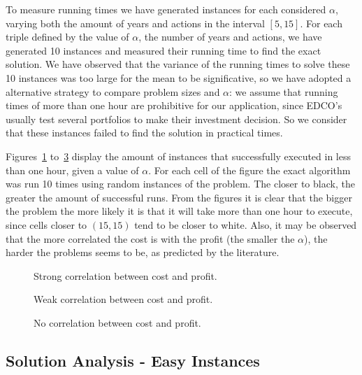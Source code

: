 To measure running times we have generated instances for each considered $\alpha$, varying both the amount of years and actions
in the interval $[5,15]$. For each triple defined by the value of $\alpha$, the number of years and actions,
we have generated 10 instances and measured their running time to find the exact solution. 
We have observed that the variance of the running times to solve these 10 instances was too large
for the mean to be significative, so we have adopted a alternative strategy to compare problem sizes
and $\alpha$:
we assume that running times of more than one hour are prohibitive for our application, since
EDCO's usually test several portfolios to make their investment decision. So we consider that
these instances failed to find the solution in practical times.

Figures~\ref{fig:time1} to~\ref{fig:time3} display the amount of instances that successfully executed in less than one hour,
given a value of $\alpha$. For each cell of the figure the exact algorithm was run 10 times using random instances of the problem.
The closer to black, the greater the amount of successful runs. 
From the figures it is clear that the bigger the problem the more likely it is that it will take more than one hour to execute, 
since cells closer to $(15,15)$ tend to be closer to white.
Also, it may be observed that the more
correlated the cost is with the profit (the smaller the $\alpha$),
the harder the problems seems to be, as predicted by the literature.

\begin{figure}
\centering
\caption{Strong correlation between cost and profit.}
\label{fig:time1}
\end{figure}

\begin{figure}
\centering
\caption{Weak correlation between cost and profit. }
\label{fig:time2}
\end{figure}

\begin{figure}
\centering
\caption{No correlation between cost and profit.}
\label{fig:time3}
\end{figure}


\subsection{Solution Analysis - Easy Instances}

